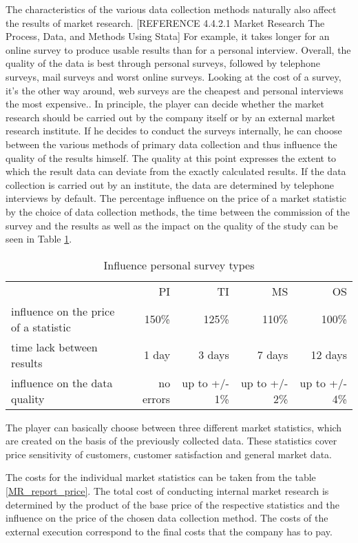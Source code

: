 The characteristics of the various data collection methods naturally also affect the results of market research. [REFERENCE 4.4.2.1 Market Research The Process, Data, and Methods Using Stata] For example, it takes longer for an online survey to produce usable results than for a personal interview. Overall, the quality of the data is best through personal surveys, followed by telephone surveys, mail surveys and worst online surveys. Looking at the cost of a survey, it's the other way around, web surveys are the cheapest and personal interviews the most expensive.. 
In principle, the player can decide whether the market research should be carried out by the company itself or by an external market research institute. If he decides to conduct the surveys internally, he can choose between the various methods of primary data collection and thus influence the quality of the results himself.
The quality at this point expresses the extent to which the result data can deviate from the exactly calculated results. If the data collection is carried out by an institute, the data are determined by telephone interviews by default. The percentage influence on the price of a market statistic by the choice of data collection methods, the time between the commission of the survey and the results as well as the impact on the quality of the study can be seen in Table \ref{MR_survey_types_influence}. 

\begin{table}[ht]
\centering
\begin{tabular}{|l|r|r|r|r|}
\hline
        & PI & TI  & MS & OS \\
influence on the price of a statistic     & 150\%    & 125\%     & 110\%     & 100\%   \\
time lack between results                 & 1 day    & 3 days     & 7 days    & 12 days   \\
influence on the data quality             & no errors    & up to +/- 1\%     & up to +/- 2\%    & up to +/- 4\%   \\
\hline
\end{tabular}
\caption{Influence personal survey types}
\label{MR_survey_types_influence}
\end{table}

The player can basically choose between three different market statistics, which are created on the basis of the previously collected data. These statistics cover price sensitivity of customers, customer satisfaction and general market data.
 
The costs for the individual market statistics can be taken from the table \ref{MR_report_price}. The total cost of conducting internal market research is determined by the product of the base price of the respective statistics and the influence on the price of the chosen data collection method. The costs of the external execution correspond to the final costs that the company has to pay.

